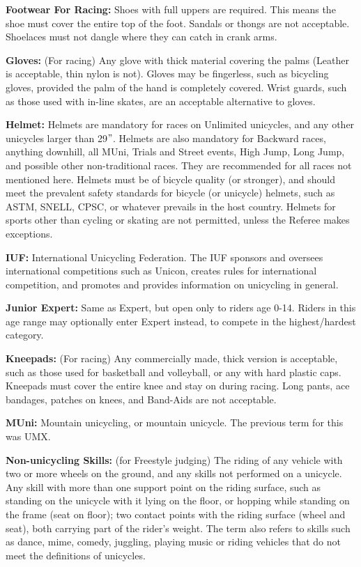 \textbf{Footwear For Racing:} Shoes with full uppers are required.
This means the shoe must cover the entire top of the foot.
Sandals or thongs are not acceptable.
Shoelaces must not dangle where they can catch in crank arms.

\textbf{Gloves:} (For racing) Any glove with thick material covering the palms (Leather is acceptable, thin nylon is not).
Gloves may be fingerless, such as bicycling gloves, provided the palm of the hand is completely covered.
Wrist guards, such as those used with in-line skates, are an acceptable alternative to gloves.

\textbf{Helmet:} Helmets are mandatory for races on Unlimited unicycles, and any other unicycles larger than 29$"$.
Helmets are also mandatory for Backward races, anything downhill, all MUni, Trials and Street events, High Jump, Long Jump, and possible other non-traditional races.
They are recommended for all races not mentioned here.
Helmets must be of bicycle quality (or stronger), and should meet the prevalent safety standards for bicycle (or unicycle) helmets, such as ASTM, SNELL, CPSC, or whatever prevails in the host country.
Helmets for sports other than cycling or skating are not permitted, unless the Referee makes exceptions.

\textbf{IUF:} International Unicycling Federation.
The IUF sponsors and oversees international competitions such as Unicon, creates rules for international competition, and promotes and provides information on unicycling in general.

\textbf{Junior Expert:} Same as Expert, but open only to riders age 0-14.
Riders in this age range may optionally enter Expert instead, to compete in the highest/hardest category.

\textbf{Kneepads:} (For racing) Any commercially made, thick version is acceptable, such as those used for basketball and volleyball, or any with hard plastic caps.
Kneepads must cover the entire knee and stay on during racing.
Long pants, ace bandages, patches on knees, and Band-Aids are not acceptable.

\textbf{MUni:} Mountain unicycling, or mountain unicycle.
The previous term for this was UMX.

\textbf{Non-unicycling Skills:} (for Freestyle judging) The riding of any vehicle with two or more wheels on the ground, and any skills not performed on a unicycle.
Any skill with more than one support point on the riding surface, such as standing on the unicycle with it lying on the floor, or hopping while standing on the frame (seat on floor); two contact points with the riding surface (wheel and seat), both carrying part of the rider's weight.
The term also refers to skills such as dance, mime, comedy, juggling, playing music or riding vehicles that do not meet the definitions of unicycles.

